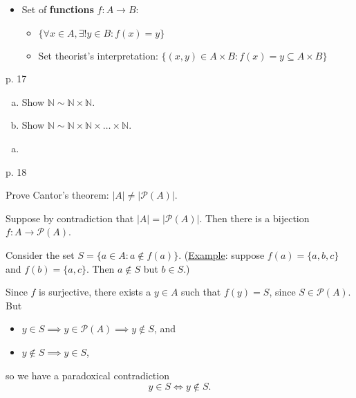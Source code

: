 \begin{itemize}
    \item Set of \textbf{functions} $f : A \to B$:
        \begin{itemize}
            \item $\{ \forall x \in A, \exists ! y \in B : f(x) = y \}$
            \item Set theorist's interpretation: $\{ (x, y) \in A \times B :
                f(x) = y \subseteq A \times B \}$
        \end{itemize}
\end{itemize}

\begin{problem}{p. 17}{}


    \begin{enumerate}[a)]
        \item Show $\mathbb{N} \sim \mathbb{N} \times \mathbb{N}$.
        \item Show $\mathbb{N} \sim \mathbb{N} \times \mathbb{N} \times \ldots \times \mathbb{N}$.
    \end{enumerate}

    \tcblower

    \begin{enumerate}[a)]
        \item 
    \end{enumerate}

\end{problem}

\begin{problem}{p. 18}{}
    

    Prove Cantor's theorem: $\lvert A \rvert \neq \lvert \mathcal{P}(A) \rvert$.

    \tcblower

    Suppose by contradiction that $\lvert A \rvert = \lvert \mathcal{P}(A) \rvert$. Then there is a bijection $f : A \to \mathcal{P}(A)$.

    Consider the set $S = \{ a \in A : a \not \in f(a) \}$. (\underline{Example}: suppose $f(a) = \{a, b, c\}$ and $f(b) = \{a, c\}$. Then $a \not \in S$ but $b \in S$.)

    Since $f$ is surjective, there exists a $y \in A$ such that $f(y) = S$, since $S \in \mathcal{P}(A)$. But
        \begin{itemize}
            \item $y \in S \implies y \in \mathcal{P}(A) \implies y \not \in S$, and
            \item $y \not \in S \implies y \in S$,
        \end{itemize}
    so we have a paradoxical contradiction
        $$ y \in S \iff y \not \in S . $$
    
\end{problem}

